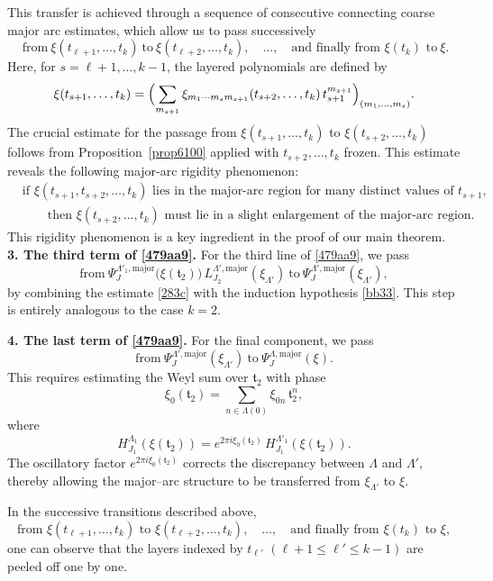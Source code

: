 \documentclass[11 pt,letterpaper]{amsart}
\theoremstyle{plain}
\theoremstyle{definition}
\theoremstyle{remark} \theoremstyle{exam} \theoremstyle{ob}
\numberwithin{equation}{section}
\begin{document}
This transfer is achieved through a sequence of consecutive
connecting coarse major arc  estimates, which allow us to pass successively  
\[\ \text{from}\
\xi(t_{\ell+1},\ldots,t_k)
\ \text{to}\
\xi(t_{\ell+2},\ldots,t_k),
\quad \ldots, \quad
\text{and finally from $\xi(t_k)$ to}\ 
\xi.
\]
Here, for \(s=\ell+1,\ldots,k-1\), the layered polynomials are defined by
\[
\xi(t_{s+1},\ldots,t_k)
=
\Bigl(
\sum_{m_{s+1}}
\xi_{m_1\cdots m_s m_{s+1}}(t_{s+2},\ldots,t_k)\,
t_{s+1}^{m_{s+1}}
\Bigr)_{(m_1,\ldots,m_s)}.
\]
The crucial estimate for the passage from
\(\xi(t_{s+1},\ldots,t_k)\) to \(\xi(t_{s+2},\ldots,t_k)\)
follows from Proposition~\ref{prop6100} applied with
\(t_{s+2},\ldots,t_k\) frozen. This estimate reveals the following major-arc rigidity phenomenon:
\begin{align*}
	&\text{if }\xi(t_{s+1},t_{s+2},\ldots,t_k)\text{ lies in the major-arc region for many distinct values of }t_{s+1},\\
	&\qquad\text{then }\xi(t_{s+2},\ldots,t_k)\text{ must lie in a slight enlargement of the major-arc region.}
\end{align*}This rigidity phenomenon is a key ingredient in the proof of our main theorem.\\
\noindent\textbf{3. The third term of \eqref{479aa9}.}
For the third line of \eqref{479aa9}, we  pass
\[
\text{from}\ 
\Psi_{J}^{\Lambda'_1,\mathrm{major}}\bigl(\xi(\mathfrak{t}_2)\bigr)\,
L^{\Lambda',\mathrm{major}}_{J_2}(\xi_{\Lambda'})
\ \text{to}\ 
\Psi^{\Lambda',\mathrm{major}}_{J}(\xi_{\Lambda'}),
\]
by combining the estimate \eqref{283c} with the induction hypothesis
\eqref{bb33}. This step is entirely analogous to the case \(k=2\).

\medskip
\noindent\textbf{4. The last term of \eqref{479aa9}.}
For the final component, we  pass
\[
\text{from}\ 
\Psi^{\Lambda',\mathrm{major}}_{J}(\xi_{\Lambda'})
\ \text{to}\ 
\Psi^{\Lambda,\mathrm{major}}_{J}(\xi).
\]
This requires estimating the Weyl sum over \(\mathfrak{t}_2\) with phase
\[
\xi_0(\mathfrak{t}_2)
=
\sum_{n\in \Lambda(0)} \xi_{0n}\,\mathfrak{t}_2^n,
\]
where
\[
H^{\Lambda_{1}}_{J_1}\!\left( \xi(\mathfrak{t}_2)\right)
=
e^{2\pi i \xi_0(\mathfrak{t}_2)}
\,H^{\Lambda'_{1}}_{J_1}\!\left( \xi(\mathfrak{t}_2)\right).
\]
The oscillatory factor \(e^{2\pi i \xi_0(\mathfrak{t}_2)}\) corrects the
discrepancy between \(\Lambda\) and \(\Lambda'\), thereby allowing the
major--arc structure to be transferred from \(\xi_{\Lambda'}\) to \(\xi\).

In the successive transitions described above,
\[
\text{from } \xi(t_{\ell+1},\ldots,t_k)
\text{ to } \xi(t_{\ell+2},\ldots,t_k),
\quad \ldots, \quad
\text{and finally from } \xi(t_k) \text{ to } \xi,
\]
one can observe that the layers indexed by \(t_{\ell'}\) \((\ell+1 \le \ell' \le k-1)\)
are peeled off one by one.
\end{document}
